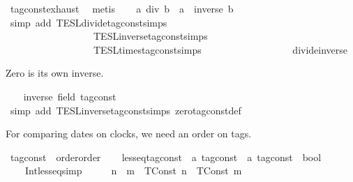 \begin{isabellebody}
\ tag{\isacharunderscore}const{\isachardot}exhaust\ \isamarkupfalse%
\ metis\isanewline
\ \ \isamarkupfalse%
\ {\isacartoucheopen}a\ div\ b\ {\isacharequal}\ a\ {\isacharasterisk}\ inverse\ b{\isacartoucheclose}\isanewline
\ \ \ \ \isamarkupfalse%
\ {\isacharparenleft}simp\ add{\isacharcolon}\ TESL{\isachardot}divide{\isacharunderscore}tag{\isacharunderscore}const{\isachardot}simps\isanewline
\ \ \ \ \ \ \ \ \ \ \ \ \ \ \ \ \ \ TESL{\isachardot}inverse{\isacharunderscore}tag{\isacharunderscore}const{\isachardot}simps\isanewline
\ \ \ \ \ \ \ \ \ \ \ \ \ \ \ \ \ \ TESL{\isachardot}times{\isacharunderscore}tag{\isacharunderscore}const{\isachardot}simps\isanewline
\ \ \ \ \ \ \ \ \ \ \ \ \ \ \ \ \ \ divide{\isacharunderscore}inverse{\isacharparenright}\isanewline
{}\isamarkupfalse%
%
\begin{isamarkuptext}%
Zero is its own inverse.%
\end{isamarkuptext}\isamarkuptrue%
\ \ \isamarkupfalse%
\ {\isacartoucheopen}inverse\ {\isacharparenleft}{}{\isacharcolon}{\isacharcolon}{\isacharparenleft}{\isacharprime}{\isasymtau}{\isacharcolon}{\isacharcolon}field\ tag{\isacharunderscore}const{\isacharparenright}{\isacharparenright}\ {\isacharequal}\ {}{\isacartoucheclose}\isanewline
\ \ \ \ \isamarkupfalse%
\ {\isacharparenleft}simp\ add{\isacharcolon}\ TESL{\isachardot}inverse{\isacharunderscore}tag{\isacharunderscore}const{\isachardot}simps\ zero{\isacharunderscore}tag{\isacharunderscore}const{\isacharunderscore}def{\isacharparenright}\isanewline
{}\isamarkupfalse%
%
\endisatagproof
{\isafoldproof}%
%
\isadelimproof
%
\endisadelimproof
\isanewline
\isanewline
{}\isamarkupfalse%
%
\begin{isamarkuptext}%
For comparing dates on clocks, we need an order on tags.%
\end{isamarkuptext}\isamarkuptrue%
\isamarkupfalse%
\ tag{\isacharunderscore}const\ {\isacharcolon}{\isacharcolon}\ {\isacharparenleft}order{\isacharparenright}order\isanewline
{}\isanewline
\ \ \isamarkupfalse%
\ less{\isacharunderscore}eq{\isacharunderscore}tag{\isacharunderscore}const\ {\isacharcolon}{\isacharcolon}\ {\isacartoucheopen}{\isacharprime}a\ tag{\isacharunderscore}const\ {\isasymRightarrow}\ {\isacharprime}a\ tag{\isacharunderscore}const\ {\isasymRightarrow}\ bool{\isacartoucheclose}\isanewline
\ \ \isanewline
\ \ \ \ Int{\isacharunderscore}less{\isacharunderscore}eq{\isacharbrackleft}simp{\isacharbrackright}{\isacharcolon}\ \ \ \ \ \ {\isacartoucheopen}n\ {\isasymle}\ m\ {\isasymLongrightarrow}\ {\isacharparenleft}TConst\ n{\isacharparenright}\ {\isasymle}\ {\isacharparenleft}TConst\ m{\isacharparenright}{\isacartoucheclose}\isanewline

\end{isabellebody}
